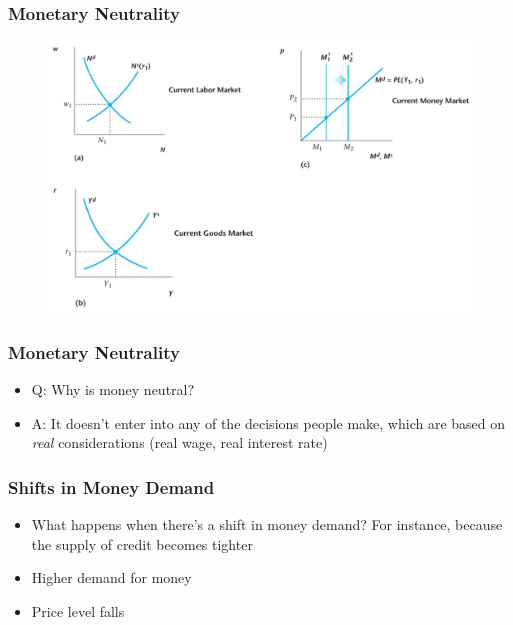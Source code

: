 \documentclass{beamer}
\begin{document}
\begin{frame}
\frametitle[alignment=center]{Monetary Neutrality}
\begin{figure}
\centering
\includegraphics[scale=0.65]{Figures/W_Fig_12pt11.png}
\end{figure}
\end{frame}

\begin{frame}
\frametitle[alignment=center]{Monetary Neutrality}
\begin{itemize}
\item Q: Why is money neutral?
\bigskip
\item A: It doesn't enter into any of the decisions people make, which are based on \emph{real} considerations (real wage, real interest rate)
\end{itemize}
\end{frame}

\begin{frame}
\frametitle[alignment=center]{Shifts in Money Demand}
\begin{itemize}
\item What happens when there's a shift in money demand?  For instance, because the supply of credit becomes tighter
\bigskip
\item Higher demand for money
\bigskip
\item Price level falls
\end{itemize}
\end{frame}
\end{document}
